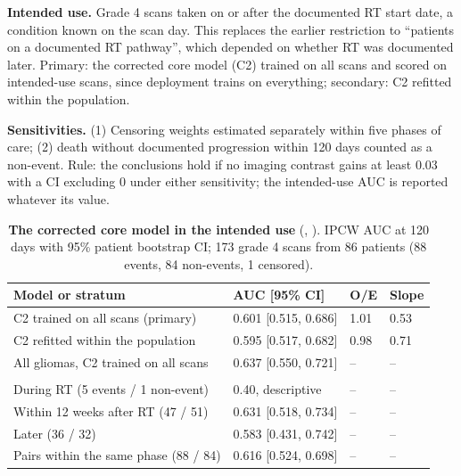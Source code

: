 \documentclass[11pt,a4paper]{article}
\begin{document}
\textbf{Intended use.} Grade 4 scans taken on or after the documented RT start date, a condition known on the scan
day. This replaces the earlier restriction to ``patients on a documented RT pathway'', which depended on whether RT
was documented later. Primary: the corrected core model (C2) trained on all scans and scored on intended-use scans,
since deployment trains on everything; secondary: C2 refitted within the population.

\textbf{Sensitivities.} (1) Censoring weights estimated separately within five phases of care; (2) death without
documented progression within 120 days counted as a non-event. Rule: the conclusions hold if no imaging contrast
gains at least 0.03 with a CI excluding 0 under either sensitivity; the intended-use AUC is reported whatever its
value.

\begin{table}[H]
\centering
\small
\renewcommand{\thetable}{S44}\renewcommand{\theHtable}{S44}
\caption{\textbf{The corrected core model in the intended use} (, ). IPCW
AUC at 120 days with 95\% patient bootstrap CI; 173 grade 4 scans from 86 patients (88 events, 84 non-events, 1
censored).}
\label{tab:S44}
\begin{tabularx}{\linewidth}{@{}L R{3.0cm} R{1.2cm} R{1.2cm}@{}}
\toprule
Model or stratum & AUC [95\% CI] & O/E & Slope \\
\midrule
C2 trained on all scans (primary) & 0.601 [0.515, 0.686] & 1.01 & 0.53 \\
C2 refitted within the population & 0.595 [0.517, 0.682] & 0.98 & 0.71 \\
All gliomas, C2 trained on all scans & 0.637 [0.550, 0.721] & -- & -- \\
\addlinespace
{} \\
During RT (5 events / 1 non-event) & 0.40, descriptive & -- & -- \\
Within 12 weeks after RT (47 / 51) & 0.631 [0.518, 0.734] & -- & -- \\
Later (36 / 32) & 0.583 [0.431, 0.742] & -- & -- \\
Pairs within the same phase (88 / 84) & 0.616 [0.524, 0.698] & -- & -- \\
\bottomrule
\end{tabularx}
\end{table}
\end{document}

